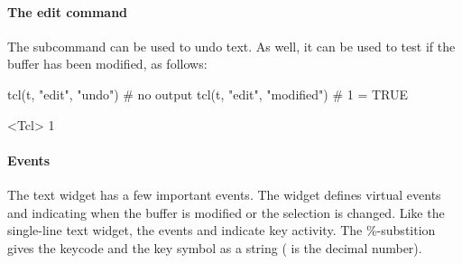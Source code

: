 \paragraph{The edit command}
The subcommand  can be used to undo text. As well, it can be used to test if the buffer has been modified, as follows:
\begin{Schunk}
\begin{Sinput}
 tcl(t, "edit", "undo")                  # no output
 tcl(t, "edit", "modified")              # 1 = TRUE
\end{Sinput}
\begin{Soutput}
<Tcl> 1 
\end{Soutput}
\end{Schunk}



\paragraph{Events}
The text widget has a few important events. 
The widget defines virtual events  and  indicating when the buffer is modified or the selection is changed. Like the single-line text widget, the events  and  indicate key activity. The \%-substition  gives the keycode and  the key symbol as a string ( is the decimal number).




